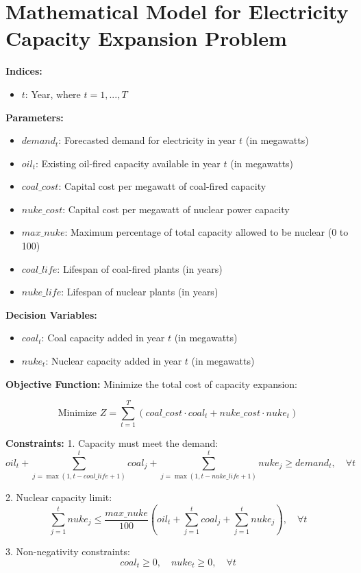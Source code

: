 \documentclass{article}
\begin{document}
\section*{Mathematical Model for Electricity Capacity Expansion Problem}

\textbf{Indices:}
\begin{itemize}
    \item $t$: Year, where $t = 1, ..., T$
\end{itemize}

\textbf{Parameters:}
\begin{itemize}
    \item $demand_t$: Forecasted demand for electricity in year $t$ (in megawatts)
    \item $oil_t$: Existing oil-fired capacity available in year $t$ (in megawatts)
    \item $coal\_cost$: Capital cost per megawatt of coal-fired capacity
    \item $nuke\_cost$: Capital cost per megawatt of nuclear power capacity
    \item $max\_nuke$: Maximum percentage of total capacity allowed to be nuclear (0 to 100)
    \item $coal\_life$: Lifespan of coal-fired plants (in years)
    \item $nuke\_life$: Lifespan of nuclear plants (in years)
\end{itemize}

\textbf{Decision Variables:}
\begin{itemize}
    \item $coal_t$: Coal capacity added in year $t$ (in megawatts)
    \item $nuke_t$: Nuclear capacity added in year $t$ (in megawatts)
\end{itemize}

\textbf{Objective Function:}
Minimize the total cost of capacity expansion:

\[
\text{Minimize } Z = \sum_{t=1}^{T} (coal\_cost \cdot coal_t + nuke\_cost \cdot nuke_t)
\]

\textbf{Constraints:}
1. Capacity must meet the demand:
\[
oil_t + \sum_{j=\max(1, t - coal\_life + 1)}^{t} coal_j + \sum_{j=\max(1, t - nuke\_life + 1)}^{t} nuke_j \geq demand_t, \quad \forall t
\]

2. Nuclear capacity limit:
\[
\sum_{j=1}^{t} nuke_j \leq \frac{max\_nuke}{100} \left( oil_t + \sum_{j=1}^{t} coal_j + \sum_{j=1}^{t} nuke_j \right), \quad \forall t
\]

3. Non-negativity constraints:
\[
coal_t \geq 0, \quad nuke_t \geq 0, \quad \forall t
\]
\end{document}

